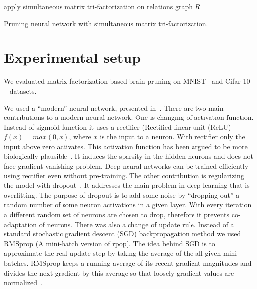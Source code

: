 \documentclass{article} %
\begin{document}
\begin{algorithm}[H]
\label{alg:MFBP}
 apply simultaneous matrix tri-factorization on relations graph $R$\;
 \caption{Pruning neural network with simultaneous matrix tri-factorization.}
 
\end{algorithm}



\section{Experimental setup}

We evaluated matrix factorization-based brain pruning on 
MNIST~\cite{lecun-mnisthandwrittendigit-2010} and Cifar-10 ~\cite{...}
datasets. 

We used a “modern” neural network, presented in~\cite{github}. There are two
main contributions to a modern neural network. One is changing of activation
function. Instead of sigmoid function it uses a rectifier (Rectified linear 
unit (ReLU) $f(x) = max(0, x)$, where $x$ is the input to a neuron. With
rectifier only the input above zero activates. This
activation function has been argued to be more biologically
plausible~\cite{AISTATS2011_GlorotBB11}. It induces the sparsity in the hidden
neurons and does not face gradient vanishing problem. Deep neural networks
can be trained efficiently using rectifier even without pre-training. 
The other contribution is regularizing the model with
dropout~\cite{srivastava2014dropout}. It addresses
the main problem in deep learning that is overfitting. The purpose of dropout
is to add some noise by “dropping out” a random number of some neuron
activations in a given layer. With every iteration a different random set of
neurons are chosen to drop, therefore it prevents co-adaptation of neurons.
There was also a change of update rule. Instead of a standard stochastic
gradient descent (SGD) backpropagation method we used RMSprop (A mini-batch
version of rpop). The idea behind SGD is to approximate the real update step by
taking the average of the all given mini batches.
RMSprop keeps a running average of its recent gradient magnitudes and divides
the next gradient by this average so that loosely gradient values are
normalized~\cite{lecture}. 
\end{document}
